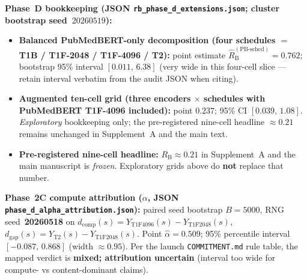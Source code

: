 \textbf{Phase~D bookkeeping (JSON \texttt{rb\_phase\_d\_extensions.json}; cluster bootstrap seed~$20260519$):}
\begin{itemize}[leftmargin=1.15em]
  \item \textbf{Balanced PubMedBERT-only decomposition (four schedules \(=\) T1B / T1F-2048 / T1F-4096 / T2):}
        point estimate \(\widehat{R}_{\mathrm{B}}^{\mathrm{(PB\mbox{-}sched)}} =
        \mathbf{0.762}\); bootstrap 95\% interval \([\mathbf{0.011},\,\mathbf{6.38}]\)
        (very wide in this four-cell slice --- retain interval verbatim from the
        audit JSON when citing).
  \item \textbf{Augmented ten-cell grid (three encoders \(\times\) schedules with PubMedBERT T1F-4096 included):}
        point \(\mathbf{0.237}\); 95\% CI \([\mathbf{0.039},\,\mathbf{1.08}]\).
        \emph{Exploratory} bookkeeping only; the pre-registered nine-cell headline
        \(\approx 0.21\) remains unchanged in Supplement~A and the main text.
  \item \textbf{Pre-registered nine-cell headline:} \(R_{\mathrm{B}}\approx 0.21\)
        in Supplement~A and the main manuscript is \emph{frozen}.
        Exploratory grids above do \textbf{not} replace that number.
\end{itemize}

\noindent \textbf{Phase~2C compute attribution ($\alpha$, JSON \texttt{phase\_d\_alpha\_attribution.json}):}
paired seed bootstrap $B=5000$, RNG seed~\textbf{20260518} on
\(d_{\mathrm{comp}}(s)=Y_{\mathrm{T1F4096}}(s)-Y_{\mathrm{T1F2048}}(s)\),
\(d_{\mathrm{gap}}(s)=Y_{\mathrm{T2}}(s)-Y_{\mathrm{T1F2048}}(s)\).
Point $\widehat{\alpha}=\mathbf{0.509}$; 95\% percentile interval
$[\mathbf{-0.087},\,\mathbf{0.868}]$ (width $\approx\mathbf{0.95}$).
Per the launch \texttt{COMMITMENT.md} rule table, the mapped verdict is
\textbf{mixed; attribution uncertain} (interval too wide for compute- vs content-dominant claims).
